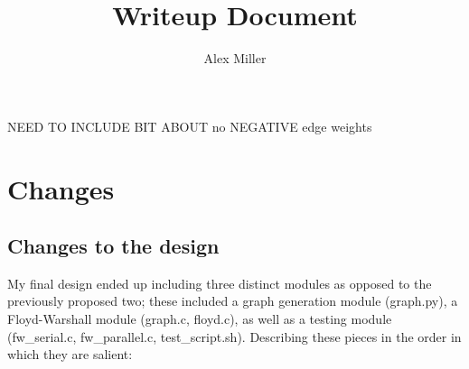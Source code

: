 \documentclass[]{article}
\title{Writeup Document}
\author{Alex Miller}
\begin{document}
	\maketitle
	
	NEED TO INCLUDE BIT ABOUT no NEGATIVE edge weights
\section{Changes}
	\subsection{Changes to the design}
	My final design ended up including three distinct modules as opposed to the previously proposed two; these included a graph generation module (graph.py), a Floyd-Warshall module (graph.c, floyd.c), as well as a testing module (fw\_serial.c, fw\_parallel.c, test\_script.sh). Describing these pieces in the order in which they are salient:
\end{document}
